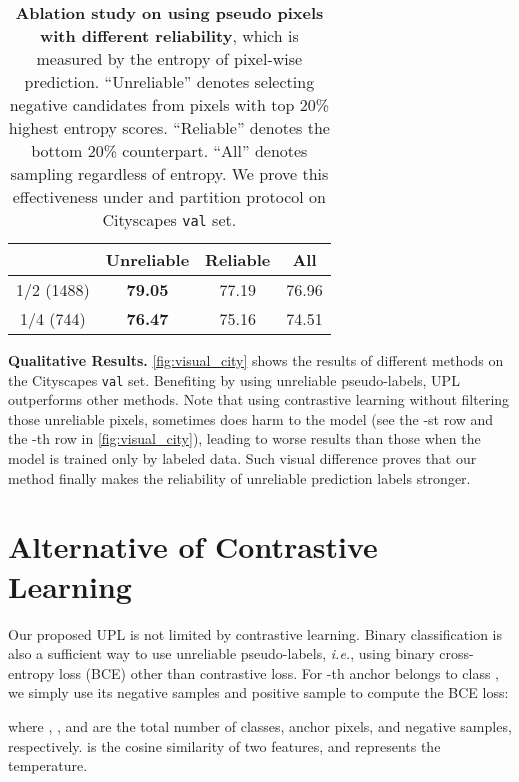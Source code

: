 \documentclass[10pt, twocolumn, letterpaper]{article}
\begin{document}
\begin{table}[t]
\centering
\caption{
\textbf{Ablation study on using pseudo pixels with different reliability}, which is measured by the entropy of pixel-wise prediction. 
``Unreliable'' denotes selecting negative candidates from pixels with top 20\% highest entropy scores.
``Reliable'' denotes the bottom 20\% counterpart. 
``All'' denotes sampling regardless of entropy.
We prove this effectiveness under  and  partition protocol on Cityscapes \texttt{val} set.
}
\label{tab:abalation_reliable_city}
\vspace{-5pt}
\setlength{\tabcolsep}{12pt}
\begin{tabular}{c|ccc}
\toprule
 & Unreliable & Reliable & All  \\
\midrule
1/2 (1488) & \textbf{79.05} & 77.19 & 76.96 \\
1/4 (744) & \textbf{76.47} & 75.16 & 74.51 \\
\bottomrule
\end{tabular}
\vspace{-10pt}
\end{table}


\noindent \textbf{Qualitative Results.} \cref{fig:visual_city} shows the results of different methods on the Cityscapes \texttt{val} set.
Benefiting by using unreliable pseudo-labels, UPL outperforms other methods.
Note that using contrastive learning without filtering those unreliable pixels, sometimes does harm to the model (see the -st row and the -th row in \cref{fig:visual_city}), leading to worse results than those when the model is trained only by labeled data.
Such visual difference proves that our method finally makes the reliability of unreliable prediction labels stronger.


\section{Alternative of Contrastive Learning}
\label{sec:alternative}

Our proposed UPL is not limited by contrastive learning.
Binary classification is also a sufficient way to use unreliable pseudo-labels, \textit{i.e.}, using binary cross-entropy loss (BCE)  other than contrastive loss.
For -th anchor  belongs to class , we simply use its negative samples  and positive sample  to compute the BCE loss:

where , , and  are the total number of classes, anchor pixels, and negative samples, respectively.
 is the cosine similarity of two features, and  represents the temperature.
\end{document}
